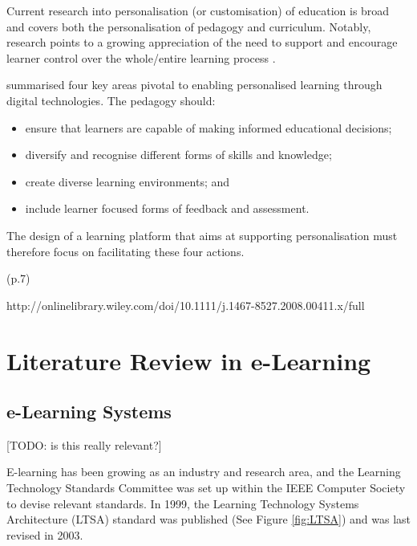 Current research into personalisation (or customisation) of education is broad and covers both the personalisation 
of pedagogy and curriculum. Notably, research points to a growing appreciation of the need to support and 
encourage learner control over the whole/entire learning process \citep{dron2007designing}.

\citet{green2005futurelab} summarised four key areas pivotal to enabling personalised learning through digital 
technologies. The pedagogy should:

\begin{itemize}
    \setlength\itemsep{0em}    
    \item ensure that learners are capable of making informed educational decisions;
    \item diversify and recognise different forms of skills and knowledge;
    \item create diverse learning environments; and
    \item include learner focused forms of feedback and assessment.
\end{itemize}

The design of a learning platform that aims at supporting personalisation must therefore focus on facilitating these 
four actions.


(p.7)

http://onlinelibrary.wiley.com/doi/10.1111/j.1467-8527.2008.00411.x/full

\section{Literature Review in e-Learning}

\subsection{e-Learning Systems}

[TODO: is this really relevant?]

E-learning has been growing as an industry and research area, and the Learning Technology Standards Committee 
was set up within the IEEE Computer Society to devise relevant standards. In 1999, the Learning Technology 
Systems Architecture (LTSA) standard was published (See Figure \ref{fig:LTSA}) and was last revised in 2003.

